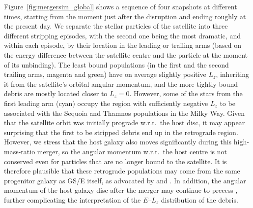 \documentclass[a4paper,useAMS,usenatbib]{mnras}
\begin{document}
Figure~\ref{fig:mergersim_global} shows a sequence of four snapshots at different times, starting from the moment just after the disruption and ending roughly at the present day. We separate the stellar particles of the satellite into three different stripping episodes, with the second one being the most dramatic, and within each episode, by their location in the leading or trailing arms (based on the energy difference between the satellite centre and the particle at the moment of its unbinding). The least bound populations (in the first and the second trailing arms, magenta and green) have on average slightly positive $L_z$, inheriting it from the satellite's orbital angular momentum, and the more tightly bound debris are mostly located closer to $L_z=0$. However, some of the stars from the first leading arm (cyan) occupy the region with sufficiently negative $L_z$ to be associated with the Sequoia \citep{Myeong2019} and Thamnos \citep{Koppelman2019b} populations in the Milky Way. Given that the satellite orbit was initially prograde w.r.t.\ the host disc, it may appear surprising that the first to be stripped debris end up in the retrograde region. However, we stress that the host galaxy also moves significantly during this high-mass-ratio merger, so the angular momentum w.r.t.\ the host centre is not conserved even for particles that are no longer bound to the satellite. It is therefore plausible that these retrograde populations may come from the same progenitor galaxy as GS/E itself, as advocated by \citet{Koppelman2020} and \citet{Amarante2022}. In addition, the angular momentum of the host galaxy disc after the merger may continue to precess \citep{Dillamore2022, Dodge2022}, further complicating the interpretation of the $E$--$L_z$ distribution of the debris.
\end{document}
